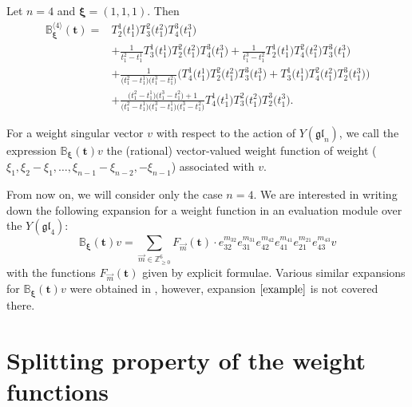\documentclass[10pt,a4paper]{amsart}
\numberwithin{equation}{section}
\begin{document}
\begin{Example} Let $n=4$ and $\boldsymbol{\xi}=(1,1,1)$. Then
\begin{align*}
{\mathbb{B}}_{\boldsymbol{\xi}}^{\langle 4\rangle}(\boldsymbol{t})={}& T^1_{2}\bigl(t_{1}^{1}\bigr) T^2_{3}\bigl(t_{1}^{2}\bigr) T^3_{4}\bigl(t_{1}^{3}\bigr) \\
&{+}\frac{1}{t_{1}^{2}-t_{1}^{1}} T^1_{3}\bigl(t_{1}^{1}\bigr) T^2_{2}\bigl(t_{1}^{2}\bigr) T^3_{4}\bigl(t_{1}^{3}\bigr)+\frac{1}{t_{1}^{3}-t_{1}^{2}} T^1_{2}\bigl(t_{1}^{1}\bigr) T^2_{4}\bigl(t_{1}^{2}\bigr) T^3_{3}\bigl(t_{1}^{3}\bigr) \\
&{+}\frac{1}{\bigl(t_{1}^{2}-t_{1}^{1}\bigr)\bigl(t_{1}^{3}-t_{1}^{2}\bigr)}\bigl(T^1_{4}\bigl(t_{1}^{1}\bigr) T^2_{2}\bigl(t_{1}^{2}\bigr) T^3_{3}\bigl(t_{1}^{3}\bigr)+T^1_{3}\bigl(t_{1}^{1}\bigr) T^2_{4}\bigl(t_{1}^{2}\bigr) T^3_{2}\bigl(t_{1}^{3}\bigr)\bigr) \\
&{+}\frac{\bigl(t_{1}^{2}-t_{1}^{1}\bigr)\bigl(t_{1}^{3}-t_{1}^{2}\bigr)+1}{\bigl(t_{1}^{2}-t_{1}^{1}\bigr)\bigl(t_{1}^{3}-t_{1}^{1}\bigr)\bigl(t_{1}^{3}-t_{1}^{2}\bigr)} T^1_{4}\bigl(t_{1}^{1}\bigr) T^2_{3}\bigl(t_{1}^{2}\bigr) T^3_{2}\bigl(t_{1}^{3}\bigr).
\end{align*}\end{Example}

For a weight singular vector $v$ with respect to the action of $Y(\mathfrak{gl}_n)$, we call the expression $\mathbb{B}_{\boldsymbol{\xi}}(\boldsymbol{t})v$ the (rational) vector-valued weight function of weight ($\xi_1,\xi_2-\xi_1,\dots,\xi_{n-1}-\xi_{n-2},-\xi_{n-1}$) associated with $v$.

From now on, we will consider only the case $n=4$. We are interested in writing down the following expansion for a weight function in an evaluation module over the $Y(\mathfrak{gl}_4)$:
\begin{equation}\label{example}
{\mathbb{B}}_{\boldsymbol{\xi}}(\boldsymbol{t})v=\sum\limits_{\vec{m}\in\mathbb{Z}_{\geq 0}^6} F_{\vec{m}}(\boldsymbol{t})\cdot e^{m_{32}}_{32}e^{m_{31}}_{31}e^{m_{42}}_{42}e^{m_{41}}_{41}e^{m_{21}}_{21}e^{m_{43}}_{43} v
\end{equation}
with the functions $F_{\vec{m}}(\boldsymbol{t})$ given by explicit formulae. Various
similar expansions for $ {\mathbb{B}}_{\boldsymbol{\xi}}(\boldsymbol{t})v$ were obtained in \cite{TVC}, however, expansion $\eqref{example}$ is not covered there.


\section{Splitting property of the weight functions}
\end{document}
